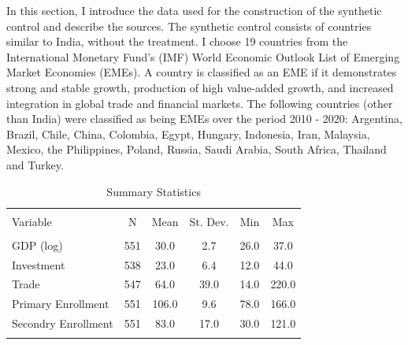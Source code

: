 \documentclass[12pt,nobind, a4paper]{reedthesis}
\begin{document}
 In this section, I introduce the data used for the construction of the synthetic control and describe the sources. The synthetic control consists of countries similar to India, without the treatment. I choose 19 countries from the International Monetary Fund's (IMF) World Economic Outlook List of Emerging Market Economies (EMEs). A country is classified as an EME if it demonstrates strong and stable growth, production of high value-added growth, and increased integration in global trade and financial markets. The following countries (other than India) were classified as being EMEs over the period 2010 - 2020: Argentina, Brazil, Chile, China, Colombia, Egypt, Hungary, Indonesia, Iran, Malaysia, Mexico, the Philippines, Poland, Russia, Saudi Arabia, South Africa, Thailand and Turkey.
 \begin{table}[!htbp] \centering 
   \label{} 
 \begin{tabular}{@{\extracolsep{5pt}}lccccc} 
 \\[-1.8ex]\hline 
 \hline \\[-1.8ex] 
 Variable & \multicolumn{1}{c}{N} & \multicolumn{1}{c}{Mean} & \multicolumn{1}{c}{St. Dev.} & \multicolumn{1}{c}{Min} & \multicolumn{1}{c}{Max} \\ 
 \hline \\[-1.8ex] 
 GDP (log) & 551 & 30.0 & 2.7 & 26.0 & 37.0 \\ 
 Investment & 538 & 23.0 & 6.4 & 12.0 & 44.0 \\ 
 Trade & 547 & 64.0 & 39.0 & 14.0 & 220.0 \\ 
 Primary Enrollment & 551 & 106.0 & 9.6 & 78.0 & 166.0 \\ 
 Secondry Enrollment & 551 & 83.0 & 17.0 & 30.0 & 121.0 \\ 
 \hline \\[-1.8ex] 
 \end{tabular} 
   \caption{ Summary Statistics} 
 \end{table}
\end{document}

